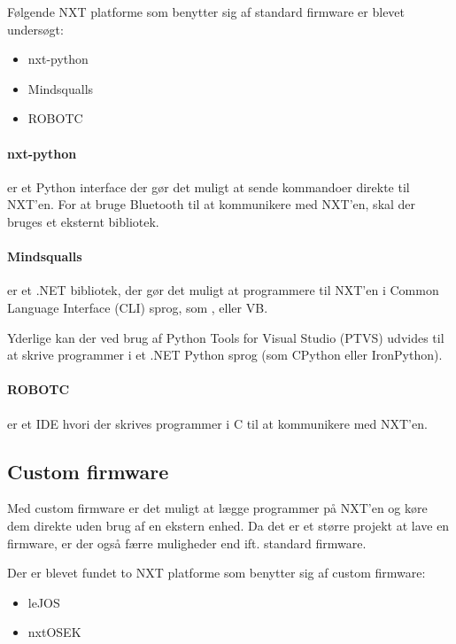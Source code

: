 Følgende NXT platforme som benytter sig af standard firmware er blevet undersøgt:
\begin{itemize}
\item{nxt-python}
\item{Mindsqualls}
\item{ROBOTC}
\end{itemize}

\paragraph{nxt-python} er et Python interface der gør det muligt at sende kommandoer direkte til NXT'en.
For at bruge Bluetooth\textregistered{} til at kommunikere med NXT'en, skal der bruges et eksternt bibliotek. \cite{nxt-python}

\paragraph{Mindsqualls} er et .NET bibliotek, der gør det muligt at programmere til NXT'en i Common Language Interface (CLI) sprog, som \csharp, \fsharp eller VB. \cite{mindsqualls}

Yderlige kan der ved brug af Python Tools for Visual Studio (PTVS) udvides til at skrive programmer i et .NET Python sprog (som CPython eller IronPython). \cite{ptvs}

\paragraph{ROBOTC} er et IDE hvori der skrives programmer i C til at kommunikere med NXT'en. \cite{robotc}

\subsection{Custom firmware}
Med custom firmware er det muligt at lægge programmer på NXT'en og køre dem direkte uden brug af en ekstern enhed.
Da det er et større projekt at lave en firmware, er der også færre muligheder end ift. standard firmware. 

Der er blevet fundet to NXT platforme som benytter sig af custom firmware:
\begin{itemize}
\item{leJOS}
\item{nxtOSEK}
\end{itemize}

